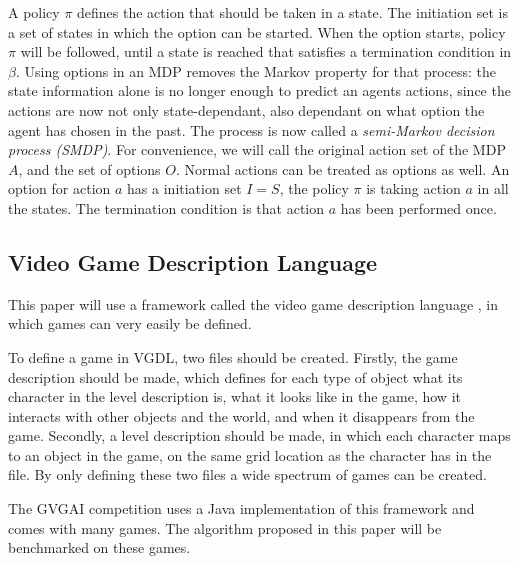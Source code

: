 A policy $\pi$ defines the action that should be taken in a state. The
initiation set is a set of states in which the option can be started. When the
option starts, policy $\pi$ will be followed, until a state is reached that
satisfies a termination condition in $\beta$. Using options in an MDP removes
the Markov property for that process: the state information alone is no longer
enough to predict an agents actions, since the actions are now not only
state-dependant, also dependant on what option the agent has chosen in the past.
The process is now called a \emph{semi-Markov decision process (SMDP)}. For
convenience, we will call the original action set of the MDP $A$, and the set of
options $O$.  Normal actions can be treated as options as well. An option for
action $a$ has a initiation set $I = S$, the policy $\pi$ is taking action $a$
in all the states.  The termination condition is that action $a$ has been
performed once.

\subsection{Video Game Description Language}
\label{subsec:vgdl}
This paper will use a framework called the video game description
language \cite{schaul2013video}, in which games can very easily be defined.

To define a game in VGDL, two files should be created. Firstly, the game
description should be made, which defines for each type of object what its
character in the level description is, what it looks like in the game, how it
interacts with other objects and the world, and when it disappears from the
game. Secondly, a level description should be made, in which each character maps
to an object in the game, on the same grid location as the character has in the
file. By only defining these two files a wide spectrum of games can be created.

The GVGAI competition uses a Java implementation of this framework and comes
with many games. The algorithm proposed in this paper will be benchmarked on
these games.
